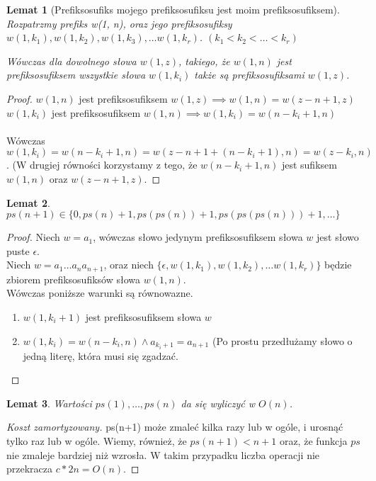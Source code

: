 \documentclass{article}
\theoremstyle{break}
\newtheorem{lemma}{Lemat}
\newtheorem{proof}{Dowód}
\begin{document}
\begin{lemma}[Prefiksosufiks mojego prefiksosufiksu jest moim prefiksosufiksem]
Rozpatrzmy prefiks w(1, n), oraz jego prefiksosufiksy $w(1, k_1), w(1, k_2), w(1, k_3), \dots w(1, k_r) $. $(k_1 < k_2 < \dots < k_r)$

Wówczas dla dowolnego słowa $w(1, z)$, takiego, że $w(1, n)$ jest prefiksosufiksem wszystkie słowa $w(1, k_i)$ także są prefiksosufiksami $w(1,z)$.
\end{lemma}
\begin{proof}
$w(1, n)$ jest prefiksosufiksem $w(1,z) \implies w(1,n) = w(z-n+1, z)$ \\
$w(1, k_i)$ jest prefiksosufiksem $w(1, n) \implies w(1, k_i) = w(n - k_i + 1, n)$ \\ \\
Wówczas $w(1, k_i) = w(n - k_i + 1, n) = w(z - n + 1 + (n - k_i + 1), n) = w(z - k_i, n)$. (W drugiej równości korzystamy z tego, że $w(n - k_i + 1, n)$ jest sufiksem $w(1, n)$ oraz $w(z-n+1, z)$. 
\end{proof}
\begin{lemma}
$ps(n+1) \in \{0, ps(n) + 1, ps(ps(n)) + 1, ps(ps(ps(n))) + 1, \dots \}$ \\
\end{lemma}
\begin{proof}
Niech $w=a_1$, wówczas słowo jedynym prefiksosufiksem słowa $w$ jest słowo puste $\epsilon$.
\\
Niech $w=a_1\dots a_na_{n+1}$, oraz niech $\{\epsilon, w(1, k_1), w(1, k_2), \dots w(1, k_r)\}$ będzie zbiorem prefiksosufiksów słowa $w(1,n)$. \\
Wówczas poniższe warunki są równowazne.
\begin{enumerate}
\item $w(1, k_i + 1)$ jest prefiksosufiksem słowa $w$
\item $w(1,k_i) = w(n - k_i, n) \land a_{k_i + 1} = a_{n+1}$ (Po prostu przedłużamy słowo o jedną literę, która musi się zgadzać.
\end{enumerate} 
\end{proof}
\begin{lemma} Wartości $ps(1), \dots, ps(n)$ da się wyliczyć w $O(n)$.
\end{lemma}
\begin{proof}[Koszt zamortyzowany]
ps(n+1) może zmaleć kilka razy lub w ogóle, i urosnąć tylko raz lub w ogóle. Wiemy, również, że $ps(n+1) < n+1$ oraz, że funkcja $ps$ nie zmaleje bardziej niż wzrosła. W takim przypadku liczba operacji nie przekracza $c * 2n = O(n)$.
\end{proof}
\end{document}
